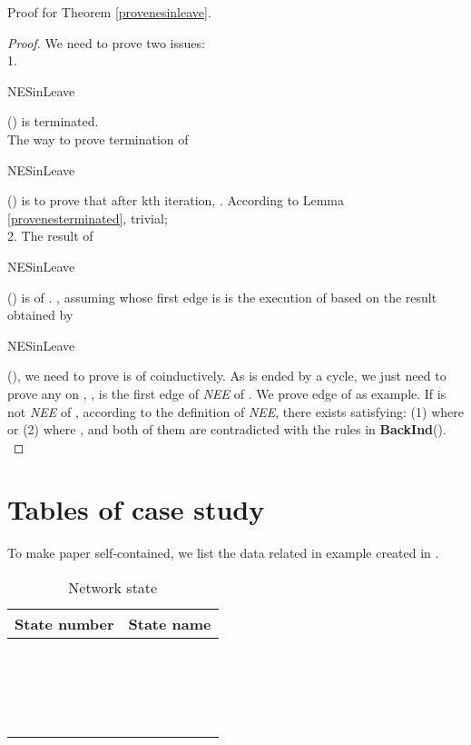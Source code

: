 \documentclass{acm_proc_article-sp}
\begin{document}
Proof for Theorem \ref{provenesinleave}.
\begin{proof}
We need to prove two issues: \\
1. \begin{bf}NESinLeave\end{bf}() is terminated.\\
The way to prove termination of \begin{bf}NESinLeave\end{bf}() is to prove  that after kth iteration, .
According to Lemma \ref{provenesterminated}, trivial;\\
2. The result of \begin{bf}NESinLeave\end{bf}() is  of . , assuming  whose first edge is  is the execution of  based on the result obtained by \begin{bf}NESinLeave\end{bf}(), we need to prove  is  of  coinductively. As  is ended by a cycle, we just need to prove any  on , , is the first edge of \textit{NEE} of . We prove edge  of  as example. If  is not \textit{NEE} of , according to the definition of \textit{NEE}, there exists  satisfying:
(1)  where  or
(2)  where , and both of them are contradicted with the rules in \textbf{BackInd}().\\
\end{proof}

\section{Tables of case study}
To make paper self-contained, we list the data related in example created in \cite{klye}.
\newcommand{\Rown}{\stepcounter{Rownumber}\theRownumber}
\begin{table}[htbp]
\scriptsize
\centering
\begin{tabular}{cc}\hline
State number & State name\\\hline
\Rown        & \\
\Rown        & \\
\Rown        & \\
\Rown        & \\
\Rown        & \\
\Rown        & \\
\Rown        & \\
\Rown        & \\
\Rown        & \\
\Rown        & \\
\Rown        & \\
\Rown        & \\
\Rown        & \\
\Rown        & \\
\Rown        & \\
\Rown        & \\
\Rown        & \\
\Rown        & \\
\hline
\end{tabular}
\caption{\label{state}Network state}
\end{table}
\end{document}

